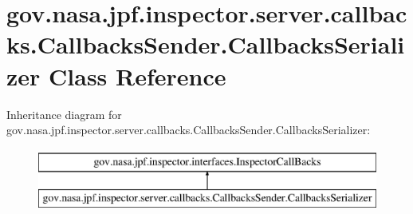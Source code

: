 \hypertarget{classgov_1_1nasa_1_1jpf_1_1inspector_1_1server_1_1callbacks_1_1_callbacks_sender_1_1_callbacks_serializer}{}\section{gov.\+nasa.\+jpf.\+inspector.\+server.\+callbacks.\+Callbacks\+Sender.\+Callbacks\+Serializer Class Reference}
\label{classgov_1_1nasa_1_1jpf_1_1inspector_1_1server_1_1callbacks_1_1_callbacks_sender_1_1_callbacks_serializer}
Inheritance diagram for gov.\+nasa.\+jpf.\+inspector.\+server.\+callbacks.\+Callbacks\+Sender.\+Callbacks\+Serializer\+:\begin{figure}[H]
\begin{center}
\leavevmode
\includegraphics[height=2.000000cm]{classgov_1_1nasa_1_1jpf_1_1inspector_1_1server_1_1callbacks_1_1_callbacks_sender_1_1_callbacks_serializer}
\end{center}
\end{figure}
